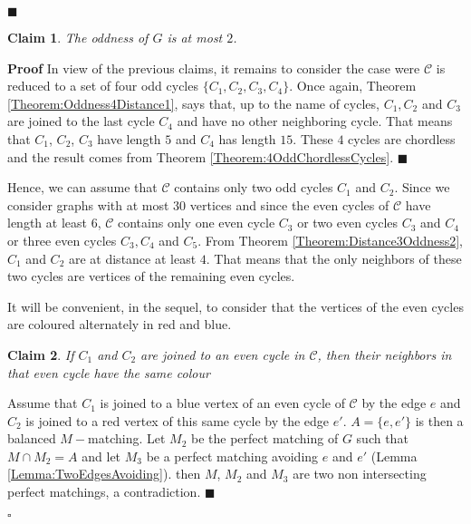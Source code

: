 \documentclass{elsart}
\theoremstyle{plain} \theoremheaderfont{\scshape}
\newtheorem{Clm}{Claim}[Thm]
\newenvironment{Prf}{{\bf \noindent Proof } }{\hfill$\square$\\}
\newenvironment{PrfClaim}{{\bf Proof }}{{\hfill\tiny{$\blacksquare$\\}}}
\begin{document}
\begin{Prf}
\begin{PrfClaim}
\end{PrfClaim}

\begin{Clm} \label{Claim:Claim5MinimumCounterExample32}
The oddness of $G$ is at most $2$.
\end{Clm}
\begin{PrfClaim} In view of the previous claims, it remains to consider the case were $\mathcal C$ is reduced to a
set of four odd cycles $\{C_1,C_2,C_3,C_4\}$. Once again, Theorem
\ref{Theorem:Oddness4Distance1}, says that, up to the name of
cycles, $C_1,C_2$ and $C_3$ are joined to the last cycle $C_4$ and
have no other neighboring cycle. That means that $C_1$, $C_2$, $C_3$
have length $5$ and $C_4$ has length $15$. These $4$ cycles are
chordless and the result comes from Theorem
\ref{Theorem:4OddChordlessCycles}.
\end{PrfClaim}




Hence, we can assume that $\mathcal C$ contains only two odd cycles
$C_1$ and $C_2$. Since we consider graphs with at most $30$ vertices
and since the even cycles of $\mathcal C$ have length at least $6$,
$\mathcal C$ contains only one even cycle $C_3$ or two even cycles
$C_3$ and $C_4$ or three even cycles $C_3,C_4$ and $C_5$. From
Theorem \ref{Theorem:Distance3Oddness2}, $C_1$ and $C_2$ are at
distance at least $4$. That means that the only neighbors of these
two cycles are vertices of the remaining even cycles.

It will be convenient, in the sequel, to consider  that the vertices
of the even cycles are coloured alternately in red and blue.

\begin{Clm} \label{Claim:Claim6MinimumCounterExample32}
If $C_1$ and $C_2$ are  joined to an even cycle in $\mathcal C$,
then their neighbors in that even cycle have the same colour
\end{Clm}
\begin{PrfClaim}
 Assume
that $C_1$ is joined to a blue vertex of an even cycle of $\mathcal
C$ by the edge $e$ and $C_2$ is joined to a red vertex of this same
cycle  by the edge $e'$. $A=\{e,e'\}$ is then a balanced
$M-$matching. Let $M_2$ be the perfect matching of $G$ such that $M
\cap M_2= A$  and let $M_3$ be a perfect matching avoiding $e$ and
$e'$ (Lemma \ref{Lemma:TwoEdgesAvoiding}). then $M$, $M_2$ and $M_3$
are two non intersecting perfect matchings, a contradiction.
\end{PrfClaim}


\end{Prf}
\end{document}

